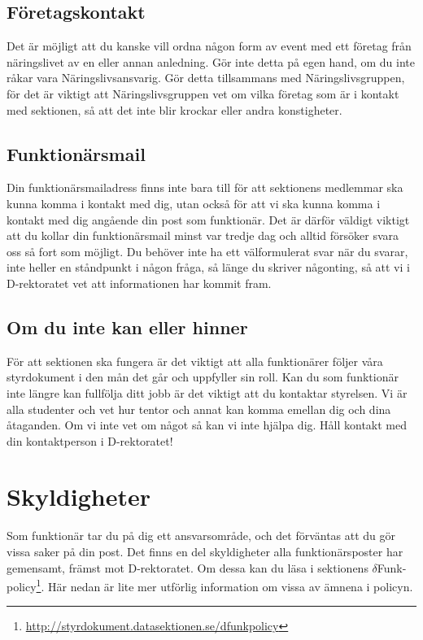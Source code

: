 \documentclass[a4paper,11pt]{article}
\begin{document}
\subsection{Företagskontakt}
Det är möjligt att du kanske vill ordna någon form av event med ett företag från näringslivet av en eller annan anledning. Gör inte detta på egen hand, om du inte råkar vara Näringslivsansvarig. Gör detta tillsammans med Näringslivsgruppen, för det är viktigt att Näringslivsgruppen vet om vilka företag som är i kontakt med sektionen, så att det inte blir krockar eller andra konstigheter.

\subsection{Funktionärsmail}
Din funktionärsmailadress finns inte bara till för att sektionens medlemmar ska kunna komma i kontakt med dig, utan också för att vi ska kunna komma i kontakt med dig angående din post som funktionär. Det är därför väldigt viktigt att du kollar din funktionärsmail minst var tredje dag och alltid försöker svara oss så fort som möjligt. Du behöver inte ha ett välformulerat svar när du svarar, inte heller en ståndpunkt i någon fråga, så länge du skriver någonting, så att vi i D-rektoratet vet att informationen har kommit fram.

\subsection{Om du inte kan eller hinner}
För att sektionen ska fungera är det viktigt att alla funktionärer följer våra styrdokument i den mån det går och uppfyller sin roll. Kan du som funktionär inte längre kan fullfölja ditt jobb är det viktigt att du kontaktar styrelsen. Vi är alla studenter och vet hur tentor och annat kan komma emellan dig och dina åtaganden. Om vi inte vet om något så kan vi inte hjälpa dig. Håll kontakt med din kontaktperson i D-rektoratet!

\section{Skyldigheter}
Som funktionär tar du på dig ett ansvarsområde, och det förväntas att du gör vissa saker på din post. Det finns en del skyldigheter alla funktionärsposter har gemensamt, främst mot D-rektoratet. Om dessa kan du läsa i sektionens $\delta$Funk-policy\footnote{\url{http://styrdokument.datasektionen.se/dfunkpolicy}}. Här nedan är lite mer utförlig information om vissa av ämnena i policyn.
\end{document}
